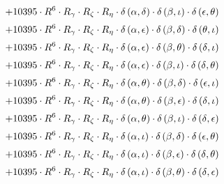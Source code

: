 \begin{subequations}
\begin{gather}
 \\[0.2em] \notag 		 + 10395 \cdot R^{6} \cdot R_{\gamma{}} \cdot R_{\zeta{}} \cdot R_{\eta{}} \cdot \delta{}\left(\alpha{}, \delta{}\right) \cdot \delta{}\left(\beta{}, \iota{}\right) \cdot \delta{}\left(\epsilon{}, \theta{}\right) 
 \\[0.2em] \notag 		 + 10395 \cdot R^{6} \cdot R_{\gamma{}} \cdot R_{\zeta{}} \cdot R_{\eta{}} \cdot \delta{}\left(\alpha{}, \epsilon{}\right) \cdot \delta{}\left(\beta{}, \delta{}\right) \cdot \delta{}\left(\theta{}, \iota{}\right) 
 \\[0.2em] \notag 		 + 10395 \cdot R^{6} \cdot R_{\gamma{}} \cdot R_{\zeta{}} \cdot R_{\eta{}} \cdot \delta{}\left(\alpha{}, \epsilon{}\right) \cdot \delta{}\left(\beta{}, \theta{}\right) \cdot \delta{}\left(\delta{}, \iota{}\right) 
 \\[0.2em] \notag 		 + 10395 \cdot R^{6} \cdot R_{\gamma{}} \cdot R_{\zeta{}} \cdot R_{\eta{}} \cdot \delta{}\left(\alpha{}, \epsilon{}\right) \cdot \delta{}\left(\beta{}, \iota{}\right) \cdot \delta{}\left(\delta{}, \theta{}\right) 
 \\[0.2em] \notag 		 + 10395 \cdot R^{6} \cdot R_{\gamma{}} \cdot R_{\zeta{}} \cdot R_{\eta{}} \cdot \delta{}\left(\alpha{}, \theta{}\right) \cdot \delta{}\left(\beta{}, \delta{}\right) \cdot \delta{}\left(\epsilon{}, \iota{}\right) 
 \\[0.2em] \notag 		 + 10395 \cdot R^{6} \cdot R_{\gamma{}} \cdot R_{\zeta{}} \cdot R_{\eta{}} \cdot \delta{}\left(\alpha{}, \theta{}\right) \cdot \delta{}\left(\beta{}, \epsilon{}\right) \cdot \delta{}\left(\delta{}, \iota{}\right) 
 \\[0.2em] \notag 		 + 10395 \cdot R^{6} \cdot R_{\gamma{}} \cdot R_{\zeta{}} \cdot R_{\eta{}} \cdot \delta{}\left(\alpha{}, \theta{}\right) \cdot \delta{}\left(\beta{}, \iota{}\right) \cdot \delta{}\left(\delta{}, \epsilon{}\right) 
 \\[0.2em] \notag 		 + 10395 \cdot R^{6} \cdot R_{\gamma{}} \cdot R_{\zeta{}} \cdot R_{\eta{}} \cdot \delta{}\left(\alpha{}, \iota{}\right) \cdot \delta{}\left(\beta{}, \delta{}\right) \cdot \delta{}\left(\epsilon{}, \theta{}\right) 
 \\[0.2em] \notag 		 + 10395 \cdot R^{6} \cdot R_{\gamma{}} \cdot R_{\zeta{}} \cdot R_{\eta{}} \cdot \delta{}\left(\alpha{}, \iota{}\right) \cdot \delta{}\left(\beta{}, \epsilon{}\right) \cdot \delta{}\left(\delta{}, \theta{}\right) 
 \\[0.2em] \notag 		 + 10395 \cdot R^{6} \cdot R_{\gamma{}} \cdot R_{\zeta{}} \cdot R_{\eta{}} \cdot \delta{}\left(\alpha{}, \iota{}\right) \cdot \delta{}\left(\beta{}, \theta{}\right) \cdot \delta{}\left(\delta{}, \epsilon{}\right) 

\end{gather}
\end{subequations}
